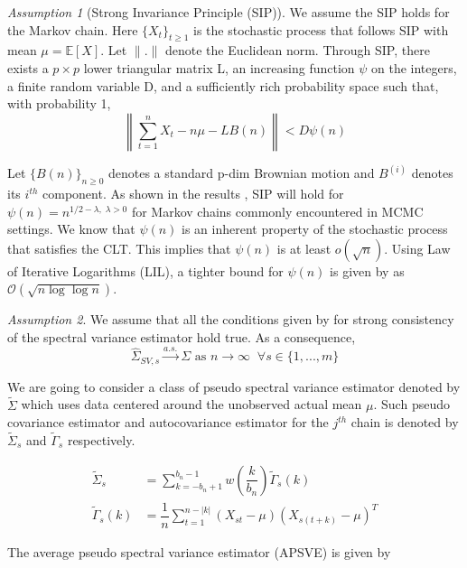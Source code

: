 \documentclass[12pt]{article}
\theoremstyle{remark}
\newtheorem{ass}{Assumption}
\begin{document}
\begin{ass}[Strong Invariance Principle (SIP)] \label{ass:sip}
    We assume the SIP holds for the Markov chain. Here $\{X_t\}_{t\geq 1}$ is the stochastic process that follows SIP with mean $\mu = \mathbb{E}[X]$. Let $\|.\|$ denote the Euclidean norm. Through SIP, there exists a $p \times p$ lower triangular matrix L, an increasing function $\psi$ on the integers, a finite random variable D, and a  sufficiently rich probability space such that, with probability 1, \\
  $$\left\|\sum_{t=1}^{n}X_t - n\mu - LB(n)\right\| < D\psi(n)$$
  
  Let $\{B(n)\}_{n\geq 0}$ denotes a standard p-dim Brownian motion and $B^{(i)}$ denotes its $i^{th}$ component. As shown in the results \cite{kuelbs1980almost}, SIP will hold for $\psi(n) = n^{1/2 - \lambda, \; \lambda > 0}$ for Markov chains commonly encountered in MCMC settings. We know that $\psi(n)$ is an inherent property of the stochastic process that satisfies the CLT. This implies that $\psi(n)$ is at least $o(\sqrt{n})$. Using Law of Iterative Logarithms (LIL), a tighter bound for $\psi(n)$ is given by \cite{stra:1964} as $\mathcal{O}(\sqrt{n\log \log n})$.
\end{ass}


\begin{ass} \label{ass:sve_consis} We assume that all the conditions given by \cite{vats:fleg:jon:2018} for strong consistency of the spectral variance estimator hold true. As a consequence, 
\[
\hat{\Sigma}_{SV,s} \xrightarrow{a.s.} \Sigma \textrm{ as } n \to \infty \;\; \forall s \in \{1,..., m\}
\]
\end{ass}


We are going to consider a class of pseudo spectral variance estimator denoted by $\tilde{\Sigma}$ which uses data centered around the unobserved actual mean $\mu$. Such pseudo covariance estimator and autocovariance estimator for the $j^{th}$ chain is denoted by $\tilde{\Sigma}_s$ and $\tilde{\Gamma}_s$ respectively.

\begin{align*}
    \tilde{\Sigma}_s &= \sum_{k=-b_n+1}^{b_n-1}w\left(\dfrac{k}{b_n}\right)\tilde{\Gamma}_s(k)\\
    \tilde{\Gamma}_s(k) &= \dfrac{1}{n}\sum_{t=1}^{n-|k|}(X_{st}-\mu)(X_{s(t+k)}-\mu)^T
\end{align*}

The average pseudo spectral variance estimator (APSVE) is given by
\end{document}
